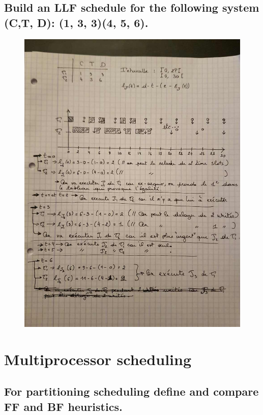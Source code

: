 \newpage
\subsection{Build an LLF schedule for the following system (C,T, D): (1, 3, 3)(4, 5, 6).}
\begin{figure}[H]
\centering
\includegraphics[height=0.7\textheight,width=\textwidth]{img_2_19__0}
\end{figure}


\newpage
\section{Multiprocessor scheduling}

\subsection{For partitioning scheduling define and compare FF and BF heuristics.}
